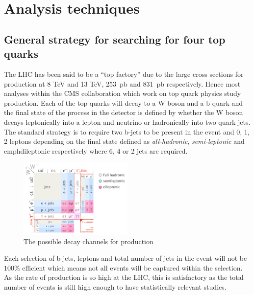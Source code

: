 \chapter{Analysis techniques}

\section{General strategy for searching for four top quarks}

The LHC has been said to be a ``top factory'' due to the large cross sections for \ttbar production at 8 TeV and 13 TeV, 253~pb and 831~pb respectively. Hence most analyses within the CMS collaboration which work on top quark physics study \ttbar production. Each of the top quarks will decay to a W boson and a b quark and the final state of the process in the detector is defined by whether the W boson decays leptonically into a lepton and neutrino or hadronically into two quark jets. The standard strategy is to require two b-jets to be present in the event and 0, 1, 2 leptons depending on the final state defined as \emph{all-hadronic}, \emph{semi-leptonic} and emph{dileptonic} respectively where 6, 4 or 2 jets are required. 

\begin{figure}[ht!]
\centering
    \includegraphics[width=0.5\textwidth]{images/Analysis/Ttbar_decay_channels.png}
    \caption{The possible decay channels for \ttbar production}
    \label{fig:ttbarDecay}
\end{figure}

Each selection of b-jets, leptons and total number of jets in the event will not be $100\%$ efficient which means not all \ttbar events will be captured within the selection. As the rate of \ttbar production is so high at the LHC, this is satisfactory as the total number of events is still high enough to have statistically relevant studies.\\

